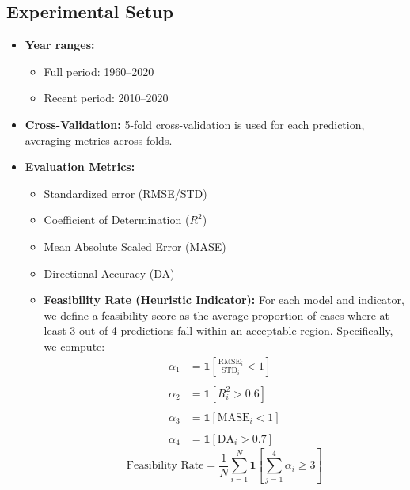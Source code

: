 \documentclass[12pt]{article}
\begin{document}
\subsection{Experimental Setup}

\begin{itemize}
    \item \textbf{Year ranges:}
    \begin{itemize}
        \item Full period: 1960--2020
        \item Recent period: 2010--2020
    \end{itemize}
    \item \textbf{Cross-Validation:} 5-fold cross-validation is used for each prediction, averaging metrics across folds.
    \item \textbf{Evaluation Metrics:}
    \begin{itemize}
        \item Standardized error (RMSE/STD)
        \item Coefficient of Determination ($R^2$)
        \item Mean Absolute Scaled Error (MASE)
        \item Directional Accuracy (DA)
        \item \textbf{Feasibility Rate (Heuristic Indicator):} For each model and indicator, we define a feasibility score as the average proportion of cases where at least 3 out of 4 predictions fall within an acceptable region. Specifically, we compute:
        \begin{align*}
        \alpha_1 &= \mathbf{1}\left[\frac{\text{RMSE}_i}{\text{STD}_i} < 1\right] \\\\
        \alpha_2 &= \mathbf{1}\left[R_i^2 > 0.6\right] \\\\
        \alpha_3 &= \mathbf{1}\left[\text{MASE}_i < 1\right] \\\\
        \alpha_4 &= \mathbf{1}\left[\text{DA}_i > 0.7\right]
        \end{align*}
        \[
        \text{Feasibility Rate} = \frac{1}{N} \sum_{i=1}^N \mathbf{1}\left[ \sum_{j=1}^4 \alpha_i \geq 3\right]
        \]

\end{itemize}
\end{itemize}
\end{document}
